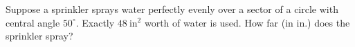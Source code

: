 Suppose a sprinkler sprays water perfectly evenly over a sector of a circle with central angle $50^{\circ}$. Exactly $48\ \text{in}^2$ worth of water is used. How far (in in.) does the sprinkler spray?
